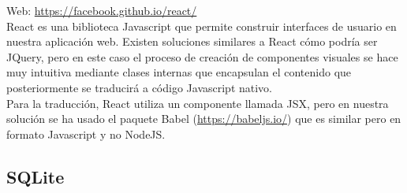 
Web: \url{https://facebook.github.io/react/}\\

React es una biblioteca Javascript que permite construir interfaces de usuario en nuestra aplicación web. Existen soluciones similares a React cómo podría ser JQuery, pero en este caso el proceso de creación de componentes visuales se hace muy intuitiva mediante clases internas que encapsulan el contenido que posteriormente se traducirá a código Javascript nativo.\\

Para la traducción, React utiliza un componente llamada JSX, pero en nuestra solución se ha usado el paquete Babel (\url{https://babeljs.io/}) que es similar pero en formato Javascript y no NodeJS.\\

\subsection{SQLite}


